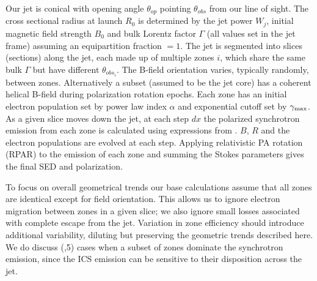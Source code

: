 Our jet is conical with opening angle $\theta_{op}$ pointing $\theta_{obs}$ from our line of sight. The cross sectional radius at launch $R_0$ is determined by the jet power $W_j$, initial magnetic field strength $B_0$ and bulk Lorentz factor $\Gamma$ (all values set in the jet frame) assuming an equipartition fraction $= 1$. The jet is segmented into slices (sections) along the jet, each made up of multiple zones $i$, which share the same bulk $\Gamma$ but have different $\theta_{obs_i}$. The B-field orientation varies, typically randomly, between zones. Alternatively a subset (assumed to be the jet core) has a coherent helical B-field during polarization rotation epochs. 
Each zone has an initial electron population set by power law index $\alpha$ and exponential cutoff set by $\gamma_{\rm max}$.
As a given slice moves down the jet, at each step $dx$ the polarized synchrotron emission from each zone is calculated using expressions from \citet{rybicki_radiative_1979}. $B$, $R$ and the electron populations are evolved at each step. Applying relativistic PA rotation (RPAR) to the emission of each zone and summing the Stokes parameters gives the final SED and polarization. 

To focus on overall geometrical trends our base calculations assume that all zones are identical except for field orientation. This allows us to ignore electron migration between zones in a given slice; we also ignore small losses associated with complete escape from the jet. Variation in zone efficiency should introduce additional variability, diluting but preserving the geometric trends described here. We do discuss (,5) cases when a subset of zones dominate the synchrotron emission, since the ICS emission can be sensitive to their disposition across the jet.



